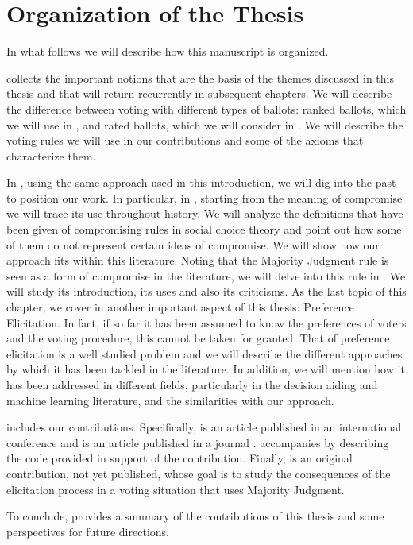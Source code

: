 \section{Organization of the Thesis}

In what follows we will describe how this manuscript is organized. 

 collects the important notions that are the basis of the themes discussed in this thesis and that will return recurrently in subsequent chapters. We will describe the difference between voting with different types of ballots: ranked ballots, which we will use in , and rated ballots, which we will consider in . We will describe the voting rules we will use in our contributions and some of the axioms that characterize them.

In , using the same approach used in this introduction, we will dig into the past to position our work. In particular, in , starting from the meaning of compromise we will trace its use throughout history. We will analyze the definitions that have been given of compromising rules in social choice theory and point out how some of them do not represent certain ideas of compromise. We will show how our approach fits within this literature. 
Noting that the Majority Judgment rule is seen as a form of compromise in the literature, we will delve into this rule in . We will study its introduction, its uses and also its criticisms.
As the last topic of this chapter, we cover in  another important aspect of this thesis: Preference Elicitation. In fact, if so far it has been assumed to know the preferences of voters and the voting procedure, this cannot be taken for granted. That of preference elicitation is a well studied problem and we will describe the different approaches by which it has been tackled in the literature. In addition, we will mention how it has been addressed in different fields, particularly in the decision aiding and machine learning literature, and the similarities with our approach.

 includes our contributions. Specifically,  is an article published in an international conference \citep{Napolitano2021} and  is an article published in a journal \citep{Cailloux2022}.  accompanies  by describing the code provided in support of the contribution. 
Finally,  is an original contribution, not yet published, whose goal is to study the consequences of the elicitation process in a voting situation that uses Majority Judgment.

To conclude,  provides a summary of the contributions of this thesis and some perspectives for future directions.
